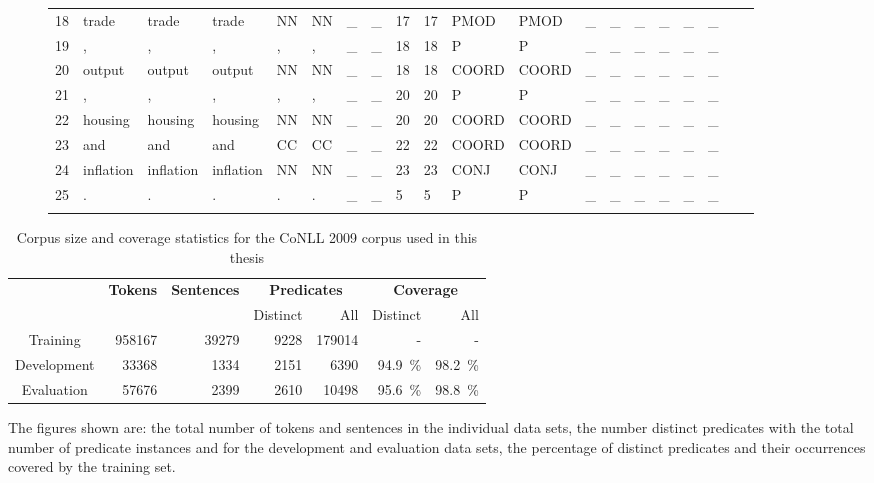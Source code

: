 \documentclass[12pt,notitlepage,a4paper]{report}
\begin{document}
\begin{figure}[p]
\begin{center}
{\begin{tabular}{llllllllllllllllllll}
18 & trade & trade & trade & NN & NN & \_ & \_ & 17 & 17 & PMOD & PMOD & \_ & \_ & \_ & \_ & \_ & \_\\
19 & , & , & , & , & , & \_ & \_ & 18 & 18 & P & P & \_ & \_ & \_ & \_ & \_ & \_\\
20 & output & output & output & NN & NN & \_ & \_ & 18 & 18 & COORD & COORD & \_ & \_ & \_ & \_ & \_ & \_\\
21 & , & , & , & , & , & \_ & \_ & 20 & 20 & P & P & \_ & \_ & \_ & \_ & \_ & \_\\
22 & housing & housing & housing & NN & NN & \_ & \_ & 20 & 20 & COORD & COORD & \_ & \_ & \_ & \_ & \_ & \_\\
23 & and & and & and & CC & CC & \_ & \_ & 22 & 22 & COORD & COORD & \_ & \_ & \_ & \_ & \_ & \_\\
24 & inflation & inflation & inflation & NN & NN & \_ & \_ & 23 & 23 & CONJ & CONJ & \_ & \_ & \_ & \_ & \_ & \_\\
25 & . & . & . & . & . & \_ & \_ & 5 & 5 & P & P & \_ & \_ & \_ & \_ & \_ & \_\\
\\
\end{tabular}
}
\end{center}
\end{figure}

\begin{table}[p]\footnotesize
\caption{Corpus size and coverage statistics for the CoNLL 2009 corpus used in this thesis}\label{tab:corpus-stats}
\begin{center}
\begin{tabular}{|c|rrrrrr|}\hline
  & \multirow{2}{*}{\bf Tokens} & \multirow{2}{*}{\bf Sentences} & \multicolumn{2}{c}{\bf Predicates} & \multicolumn{2}{c|}{\bf Coverage} \\
 & & & Distinct & All & Distinct & All \\\hline
Training & 958167 & 39279 & 9228 & 179014 & - & - \\
Development & 33368 & 1334 & 2151 & 6390 & 94.9~\% & 98.2~\% \\
Evaluation & 57676 & 2399 & 2610 & 10498 & 95.6~\% & 98.8~\% \\\hline
\end{tabular}
\end{center}
The figures shown are: the total number of tokens and sentences in the individual data sets, the number distinct predicates with the total number of predicate instances and for the development and evaluation data sets, the percentage of distinct predicates and their occurrences covered by the training set.
\end{table}
\end{document}
